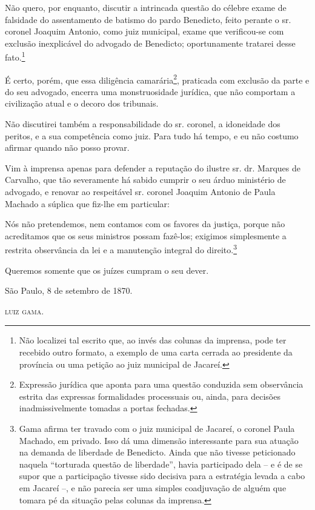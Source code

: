 {Não quero, por enquanto, discutir a intrincada questão do célebre exame
de falsidade do assentamento de batismo do pardo Benedicto, feito
perante o sr. coronel Joaquim Antonio, como juiz municipal, exame que
verificou-se com exclusão inexplicável do advogado de Benedicto;
oportunamente tratarei desse fato.\footnote{ Não localizei tal escrito
  que, ao invés das colunas da imprensa, pode ter recebido outro
  formato, a exemplo de uma carta cerrada ao presidente da província ou
  uma petição ao juiz municipal de Jacareí.}

É certo, porém, que essa diligência camarária\footnote{ Expressão
  jurídica que aponta para uma questão conduzida sem observância estrita
  das expressas formalidades processuais ou, ainda, para decisões
  inadmissivelmente tomadas a portas fechadas.}, praticada com exclusão
da parte e do seu advogado, encerra uma monstruosidade jurídica, que não
comportam a civilização atual e o decoro dos tribunais.

Não discutirei também a responsabilidade do sr. coronel, a idoneidade
dos peritos, e a sua competência como juiz. Para tudo há tempo, e eu não
costumo afirmar quando não posso provar.

Vim à imprensa apenas para defender a reputação do ilustre sr. dr.
Marques de Carvalho, que tão severamente há sabido cumprir o seu árduo
ministério de advogado, e renovar ao respeitável sr. coronel Joaquim
Antonio de Paula Machado a súplica que fiz-lhe em particular:

Nós não pretendemos, nem contamos com os favores da justiça, porque não
acreditamos que os seus ministros possam fazê-los; exigimos simplesmente
a restrita observância da lei e a manutenção integral do
direito.\footnote{ Gama afirma ter travado com o juiz municipal de
  Jacareí, o coronel Paula Machado, em privado. Isso dá uma dimensão
  interessante para sua atuação na demanda de liberdade de Benedicto.
  Ainda que não tivesse peticionado naquela ``torturada questão de
  liberdade'', havia participado dela -- e é de se supor que a
  participação tivesse sido decisiva para a estratégia levada a cabo em
  Jacareí --, e não parecia ser uma simples coadjuvação de alguém que
  tomara pé da situação pelas colunas da imprensa.}

Queremos somente que os juízes cumpram o seu dever.
\begin{flushright}
São Paulo, 8 de setembro de 1870.

\textsc{luiz gama}.
\end{flushright}

}
